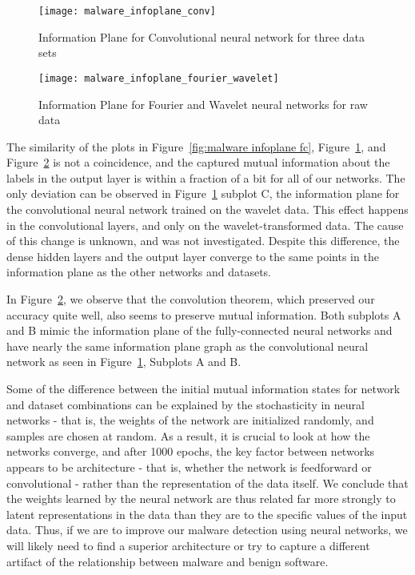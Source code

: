 \begin{figure}[h!]
\begin{center}
\texttt{[image: malware\_infoplane\_conv]}
\caption{Information Plane for Convolutional neural network for three data sets}
\label{fig:malware infoplane conv}
\centering
\end{center}
\end{figure}

\begin{figure}[h!]
\begin{center}
\texttt{[image: malware\_infoplane\_fourier\_wavelet]}
\caption{Information Plane for Fourier and Wavelet neural networks for raw data}
\label{fig:malware infoplane fourier-wavelet}
\centering
\end{center}
\end{figure}


The similarity of the plots in Figure~\ref{fig:malware infoplane fc}, Figure~\ref{fig:malware infoplane conv}, and Figure~\ref{fig:malware infoplane fourier-wavelet} is not a coincidence, and the captured mutual information about the labels in the output layer is within a fraction of a bit for all of our networks. 
The only deviation can be observed in Figure~\ref{fig:malware infoplane conv} subplot C, the information plane for the convolutional neural network trained on the wavelet data. 
This effect happens in the convolutional layers, and only on the wavelet-transformed data.
The cause of this change is unknown, and was not investigated.
Despite this difference, the dense hidden layers and the output layer converge to the same points in the information plane as the other networks and datasets.

In Figure~\ref{fig:malware infoplane fourier-wavelet}, we observe that the convolution theorem, which preserved our accuracy quite well, also seems to preserve mutual information.
Both subplots A and B mimic the information plane of the fully-connected neural networks and have nearly the same information plane graph as the convolutional neural network as seen in Figure~\ref{fig:malware infoplane conv}, Subplots A and B.

Some of the difference between the initial mutual information states for network and dataset combinations can be explained by the stochasticity in neural networks - that is, the weights of the network are initialized randomly, and samples are chosen at random. 
As a result, it is crucial to look at how the networks converge, and after 1000 epochs, the key factor between networks appears to be architecture - that is, whether the network is feedforward or convolutional - rather than the representation of the data itself.
We conclude that the weights learned by the neural network are thus related far more strongly to latent representations in the data than they are to the specific values of the input data.
Thus, if we are to improve our malware detection using neural networks, we will likely need to find a superior architecture or try to capture a different artifact of the relationship between malware and benign software.

